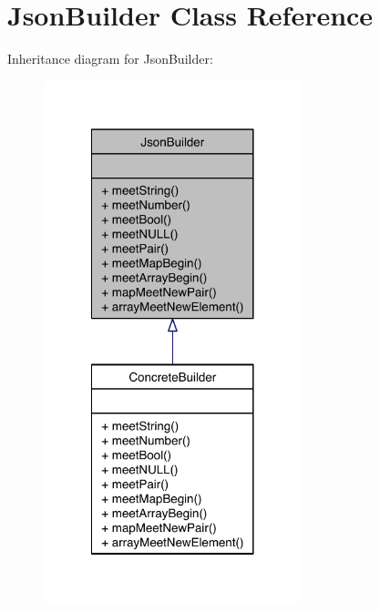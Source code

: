 \hypertarget{class_json_builder}{\section{Json\-Builder Class Reference}
\label{class_json_builder}
}


Inheritance diagram for Json\-Builder\-:\nopagebreak
\begin{figure}[H]
\begin{center}
\leavevmode
\includegraphics[width=212pt]{class_json_builder__inherit__graph}
\end{center}
\end{figure}
